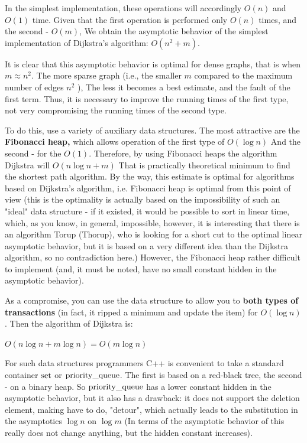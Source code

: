In the simplest implementation, these operations will accordingly $O (n)$ and $O (1)$ time. Given that the first operation is performed only $O (n)$ times, and the second - $O (m)$, We obtain the asymptotic behavior of the simplest implementation of Dijkstra's algorithm: $O (n ^ 2 + m)$.

It is clear that this asymptotic behavior is optimal for dense graphs, that is when $m \approx n ^ 2$. The more sparse graph (i.e., the smaller $m$ compared to the maximum number of edges $n ^ 2$ ), The less it becomes a best estimate, and the fault of the first term. Thus, it is necessary to improve the running times of the first type, not very compromising the running times of the second type.

To do this, use a variety of auxiliary data structures. The most attractive are the \textbf{Fibonacci heap,} which allows operation of the first type of $O (\log n)$ And the second - for the $O (1)$. Therefore, by using Fibonacci heaps the algorithm Dijkstra will $O (n \log n + m)$ That is practically theoretical minimum to find the shortest path algorithm. By the way, this estimate is optimal for algorithms based on Dijkstra's algorithm, i.e. Fibonacci heap is optimal from this point of view (this is the optimality is actually based on the impossibility of such an "ideal" data structure - if it existed, it would be possible to sort in linear time, which, as you know, in general, impossible, however, it is interesting that there is an algorithm Torup (Thorup), who is looking for a short cut to the optimal linear asymptotic behavior, but it is based on a very different idea than the Dijkstra algorithm, so no contradiction here.) However, the Fibonacci heap rather difficult to implement (and, it must be noted, have no small constant hidden in the asymptotic behavior).

As a compromise, you can use the data structure to allow you to \textbf{both types of transactions} (in fact, it ripped a minimum and update the item) for $O (\log n)$. Then the algorithm of Dijkstra is:

$O (n \log n + m \log n) = O (m \log n)$

For such data structures programmers C++ is convenient to take a standard container $\rm set$ or $\rm priority \_queue$. The first is based on a red-black tree, the second - on a binary heap. So $\rm priority \_queue$ has a lower constant hidden in the asymptotic behavior, but it also has a drawback: it does not support the deletion element, making have to do, "detour", which actually leads to the substitution in the asymptotics $\log n$ on $\log m$ (In terms of the asymptotic behavior of this really does not change anything, but the hidden constant increases).


